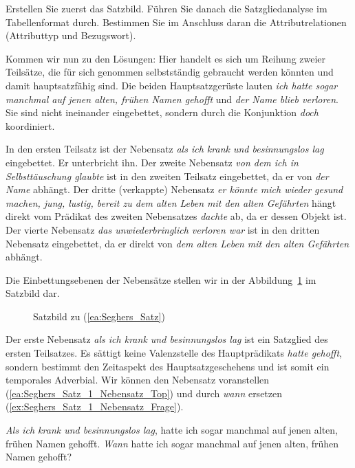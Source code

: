 Erstellen Sie zuerst das Satzbild. Führen Sie danach die Satzgliedanalyse im Tabellenformat durch. Bestimmen Sie im Anschluss daran die Attributrelationen (Attributtyp und Bezugswort).


Kommen wir nun zu den Lösungen: Hier handelt es sich um Reihung zweier Teilsätze, die für sich genommen selbstständig gebraucht werden könnten und damit hauptsatzfähig sind. Die beiden Hauptsatzgerüste lauten \textit{ich hatte sogar manchmal auf jenen alten, frühen Namen gehofft} und \textit{der Name blieb verloren}. Sie sind nicht ineinander eingebettet, sondern durch die Konjunktion \textit{doch} koordiniert.   

In den ersten Teilsatz ist der Nebensatz \textit{als ich krank und besinnungslos lag} eingebettet. Er unterbricht ihn. Der zweite Nebensatz \textit{von dem ich in Selbsttäuschung glaubte} ist in den zweiten Teilsatz eingebettet, da er von \textit{der Name} abhängt. Der dritte (verkappte) Nebensatz \textit{er könnte mich wieder gesund machen, jung, lustig, bereit zu dem alten Leben mit den alten Gefährten} hängt direkt vom Prädikat des zweiten Nebensatzes \textit{dachte} ab, da er dessen Objekt ist. Der vierte Nebensatz \textit{das unwiederbringlich verloren war} ist in den dritten Nebensatz eingebettet, da er direkt von \textit{dem alten Leben mit den alten Gefährten} abhängt.

Die Einbettungsebenen der Nebensätze stellen wir in der Abbildung~\ref{Abb:Satzbild_Seghrs} im Satzbild dar.

\begin{figure}
    \centering
    
    \caption{Satzbild zu (\ref{ea:Seghers_Satz})}
    \label{Abb:Satzbild_Seghrs}
\end{figure}


Der erste Nebensatz \textit{als ich krank und besinnungslos lag} ist ein Satzglied des ersten Teilsatzes. Es sättigt keine Valenzstelle des Hauptprädikats \textit{hatte gehofft}, sondern bestimmt den Zeitaspekt des Hauptsatzgeschehens und ist somit ein temporales Adverbial. Wir können den Nebensatz voranstellen (\ref{ea:Seghers_Satz_1_Nebensatz_Top}) und durch \textit{wann} ersetzen (\ref{ex:Seghers_Satz_1_Nebensatz_Frage}).

\ea \label{ea:Seghers_Satz_1_Nebensatz}
\ea \label{ea:Seghers_Satz_1_Nebensatz_Top} \textit{Als ich krank und besinnungslos lag}, hatte ich sogar manchmal auf jenen alten, frühen Namen gehofft.
\ex \label{ex:Seghers_Satz_1_Nebensatz_Frage} \textit{Wann} hatte ich sogar manchmal auf jenen alten, frühen Namen gehofft?
\z 
\z 

